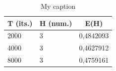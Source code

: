 \documentclass[jou]{apa6}
\begin{document}
\begin{table}[]
\centering
\caption{My caption}
\label{my-label}
\begin{tabular}{@{}lll@{}}
\toprule
\multicolumn{1}{c}{T (its.)} & \multicolumn{1}{c}{H (num.)} & \multicolumn{1}{c}{E(H)} \\ \midrule
2000                         & 3                            & 0,4842093                \\
4000                         & 3                            & 0,4627912                \\
8000                         & 3                            & 0,4759161                \\ \bottomrule
\end{tabular}
\end{table}
\end{document}

